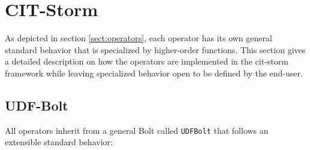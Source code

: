\section{CIT-Storm}
\label{sect:citStorm}

As depicted in section \ref{sect:operators}, each operator has its own general standard behavior that is specialized by higher-order functions. This section gives a detailed description on how the operators are implemented in the cit-storm framework while leaving specialized behavior open to be defined by the end-user. 

\subsection{UDF-Bolt}
\label{sect:udfBolt}

All operators inherit from a general Bolt called \texttt{UDFBolt} that follows an extensible standard behavior:

